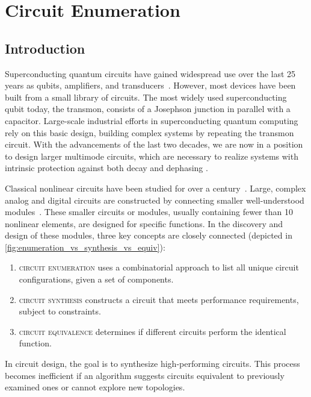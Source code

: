 
\chapter{Circuit Enumeration}\label{chp:enumeration}


\section{Introduction}

Superconducting quantum circuits have gained widespread use over the last 25 years as qubits, amplifiers, and transducers~\cite{blaisCircuitQuantumElectrodynamics2021a}. However, most devices have been built from a small library of circuits. The most widely used superconducting qubit today, the transmon, consists of a Josephson junction in parallel with a capacitor. Large-scale industrial efforts in superconducting quantum computing rely on this basic design, building complex systems by repeating the transmon circuit. With the advancements of the last two decades, we are now in a position to design larger multimode circuits, which are necessary to realize systems with intrinsic protection against both decay and dephasing \cite{gyenisMovingTransmonNoiseProtected2021b}.

 Classical nonlinear circuits have been studied for over a century~\cite{fleming_1905,forest_1906}. Large, complex analog and digital circuits are constructed by connecting smaller well-understood modules~\cite{sedra2020}. 
 These smaller circuits or modules, usually containing fewer than 10 nonlinear elements, are designed for specific functions. 
In the discovery and design of these modules, three key concepts are closely connected (depicted in \cref{fig:enumeration_vs_synthesis_vs_equiv}):
\begin{enumerate}
    \item \textsc{circuit enumeration} uses a combinatorial approach to list all unique circuit configurations, given a set of components. 
    \item \textsc{circuit synthesis} constructs a circuit that meets performance requirements, subject to constraints.  
    \item \textsc{circuit equivalence} determines if different circuits perform the identical function.
\end{enumerate}
In circuit design, the goal is to synthesize high-performing circuits. This process becomes inefficient if an algorithm suggests circuits equivalent to previously examined ones or cannot explore new topologies.




